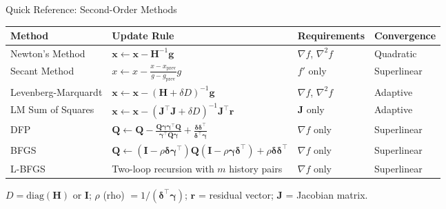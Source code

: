 \documentclass[aspectratio=169,10pt]{beamer}
\newcommand{\xbf}{\mathbf{x}}
\newcommand{\gbf}{\mathbf{g}}
\newcommand{\Hbf}{\mathbf{H}}
\newcommand{\Ibf}{\mathbf{I}}
\newcommand{\deltabf}{\boldsymbol{\delta}}
\newcommand{\gammabf}{\boldsymbol{\gamma}}
\begin{document}

\begin{frame}{Quick Reference: Second-Order Methods}
  \centering
  \small
  \begin{tabular}{p{2.8cm}p{4.5cm}p{2.5cm}p{2.0cm}}
    \toprule
    \textbf{Method} & \textbf{Update Rule} & \textbf{Requirements} & \textbf{Convergence} \\
    \midrule
    Newton's Method &
    $\xbf \leftarrow \xbf - \Hbf^{-1}\gbf$ &
    $\nabla f$, $\nabla^2 f$ &
    Quadratic \\[4pt]
    Secant Method &
    $x \leftarrow x - \tfrac{x - x_\text{prev}}{g - g_\text{prev}}g$ &
    $f'$ only &
    Superlinear \\[4pt]
    Levenberg-Marquardt &
    $\xbf \leftarrow \xbf - (\Hbf + \delta D)^{-1}\gbf$ &
    $\nabla f$, $\nabla^2 f$ &
    Adaptive \\[4pt]
    LM Sum of Squares &
    $\xbf \leftarrow \xbf - (\mathbf{J}^\top\mathbf{J} + \delta D)^{-1}\mathbf{J}^\top\mathbf{r}$ &
    $\mathbf{J}$ only &
    Adaptive \\[4pt]
    DFP &
    $\mathbf{Q} \leftarrow \mathbf{Q} - \tfrac{\mathbf{Q}\gammabf\gammabf^\top\mathbf{Q}}{\gammabf^\top\mathbf{Q}\gammabf} + \tfrac{\deltabf\deltabf^\top}{\deltabf^\top\gammabf}$ &
    $\nabla f$ only &
    Superlinear \\[4pt]
    BFGS &
    $\mathbf{Q} \leftarrow (\Ibf - \rho\deltabf\gammabf^\top)\mathbf{Q}(\Ibf - \rho\gammabf\deltabf^\top) + \rho\deltabf\deltabf^\top$ &
    $\nabla f$ only &
    Superlinear \\[4pt]
    L-BFGS &
    Two-loop recursion with $m$ history pairs &
    $\nabla f$ only &
    Superlinear \\
    \bottomrule
  \end{tabular}
  \vspace{6pt}
  {\scriptsize $D = \mathrm{diag}(\Hbf)$ or $\Ibf$; $\rho$ (rho) $= 1/(\deltabf^\top\gammabf)$;
   $\mathbf{r}$ = residual vector; $\mathbf{J}$ = Jacobian matrix.}
\end{frame}
\end{document}
